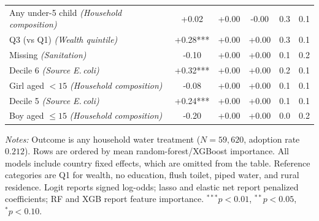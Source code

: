 \begin{table}[htbp]
\begin{tabular}{lccccc}
Any under-5 child \textit{(Household composition)} & +0.02 & +0.00 & -0.00 & 0.3 & 0.1 \\
Q3 (vs Q1) \textit{(Wealth quintile)} & +0.28*** & +0.00 & +0.00 & 0.3 & 0.1 \\
Missing \textit{(Sanitation)} & -0.10 & +0.00 & +0.00 & 0.1 & 0.2 \\
Decile 6 \textit{(Source E.\,coli)} & +0.32*** & +0.00 & +0.00 & 0.2 & 0.1 \\
Girl aged $<15$ \textit{(Household composition)} & -0.08 & +0.00 & +0.00 & 0.1 & 0.1 \\
Decile 5 \textit{(Source E.\,coli)} & +0.24*** & +0.00 & +0.00 & 0.1 & 0.1 \\
Boy aged $\leq15$ \textit{(Household composition)} & -0.20 & +0.00 & +0.00 & 0.0 & 0.2 \\
\bottomrule
\end{tabular}
\par\vspace{3pt}
\begin{minipage}{\linewidth}\footnotesize \textit{Notes:} Outcome is any household water treatment ($N=59,620$, adoption rate $0.212$). Rows are ordered by mean random-forest/XGBoost importance. All models include country fixed effects, which are omitted from the table. Reference categories are Q1 for wealth, no education, flush toilet, piped water, and rural residence. Logit reports signed log-odds; lasso and elastic net report penalized coefficients; RF and XGB report feature importance. $^{***}p<0.01$, $^{**}p<0.05$, $^{*}p<0.10$.\end{minipage}
\end{table}
